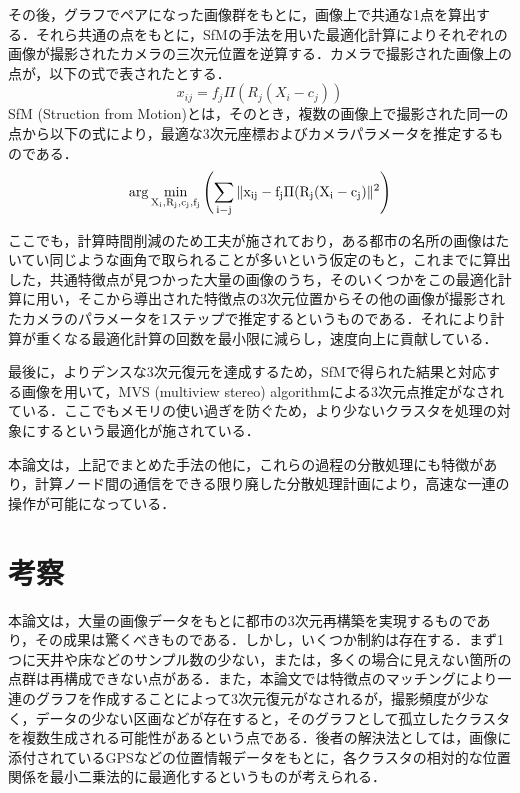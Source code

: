 \documentclass[onecolumn]{preport}
\begin{document}
その後，グラフでペアになった画像群をもとに，画像上で共通な1点を算出する．それら共通の点をもとに，SfMの手法を用いた最適化計算によりそれぞれの画像が撮影されたカメラの三次元位置を逆算する．カメラで撮影された画像上の点が，以下の式で表されたとする．
\begin{equation}
  x_{ij} = f_j\Pi(R_j(X_i-c_j))
\end{equation}
SfM (Struction from Motion)とは，そのとき，複数の画像上で撮影された同一の点から以下の式により，最適な3次元座標およびカメラパラメータを推定するものである．
\begin{equation}
  \rm{arg}\min_{X_i,R_j,c_j,f_j}\left(\sum_{i-j}\|x_{ij}-f_j\Pi(R_j(X_i-c_j)\|^2\right)
\end{equation}

ここでも，計算時間削減のため工夫が施されており，ある都市の名所の画像はたいてい同じような画角で取られることが多いという仮定のもと，これまでに算出した，共通特徴点が見つかった大量の画像のうち，そのいくつかをこの最適化計算に用い，そこから導出された特徴点の3次元位置からその他の画像が撮影されたカメラのパラメータを1ステップで推定するというものである．それにより計算が重くなる最適化計算の回数を最小限に減らし，速度向上に貢献している．

最後に，よりデンスな3次元復元を達成するため，SfMで得られた結果と対応する画像を用いて，MVS (multiview stereo) algorithmによる3次元点推定がなされている．ここでもメモリの使い過ぎを防ぐため，より少ないクラスタを処理の対象にするという最適化が施されている．

本論文は，上記でまとめた手法の他に，これらの過程の分散処理にも特徴があり，計算ノード間の通信をできる限り廃した分散処理計画により，高速な一連の操作が可能になっている．

\section{考察}

本論文は，大量の画像データをもとに都市の3次元再構築を実現するものであり，その成果は驚くべきものである．しかし，いくつか制約は存在する．まず1つに天井や床などのサンプル数の少ない，または，多くの場合に見えない箇所の点群は再構成できない点がある．また，本論文では特徴点のマッチングにより一連のグラフを作成することによって3次元復元がなされるが，撮影頻度が少なく，データの少ない区画などが存在すると，そのグラフとして孤立したクラスタを複数生成される可能性があるという点である．後者の解決法としては，画像に添付されているGPSなどの位置情報データをもとに，各クラスタの相対的な位置関係を最小二乗法的に最適化するというものが考えられる．
\end{document}
